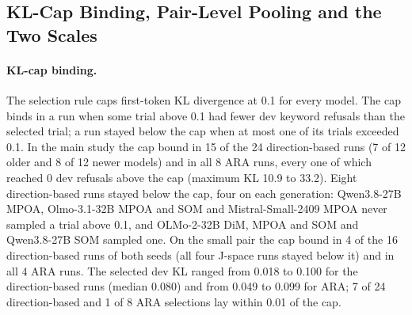 \subsection{KL-Cap Binding, Pair-Level Pooling and the Two Scales}
\label{app:kl-cap}

\paragraph{KL-cap binding.} The selection rule caps first-token KL divergence
at 0.1 for every model. The cap binds in a run when some trial above 0.1 had
fewer dev keyword refusals than the selected trial; a run stayed below the cap
when at most one of its trials exceeded 0.1. In the main study the cap bound
in 15 of the 24 direction-based runs (7 of 12 older and 8 of 12 newer models)
and in all 8 ARA runs, every one of which reached 0 dev refusals above the cap
(maximum KL 10.9 to 33.2). Eight direction-based runs stayed below the cap,
four on each generation: Qwen3.8-27B MPOA, Olmo-3.1-32B MPOA and SOM and
Mistral-Small-2409 MPOA never sampled a trial above 0.1, and OLMo-2-32B DiM,
MPOA and SOM and Qwen3.8-27B SOM sampled one. On the small pair the cap bound
in 4 of the 16 direction-based runs of both seeds (all four J-space runs
stayed below it) and in all 4 ARA runs. The selected dev KL ranged from 0.018
to 0.100 for the direction-based runs (median 0.080) and from 0.049 to 0.099
for ARA; 7 of 24 direction-based and 1 of 8 ARA selections lay within 0.01 of
the cap.

